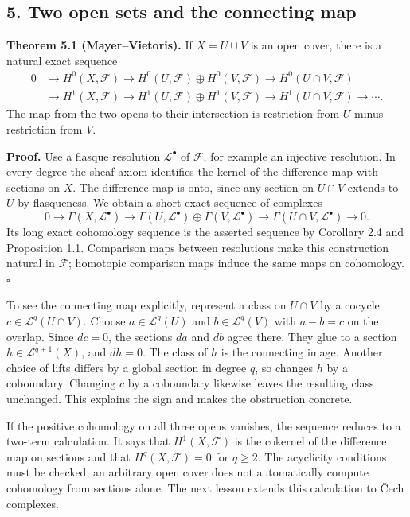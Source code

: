\documentclass[11pt]{article}
\begin{document}
\subsection{5. Two open sets and the connecting
map}\label{two-open-sets-and-the-connecting-map}

\textbf{Theorem 5.1 (Mayer--Vietoris).} If \(X=U\cup V\) is an open
cover, there is a natural exact sequence \[
\begin{aligned}
0&\to H^0(X,\mathcal F)
\to H^0(U,\mathcal F)\oplus H^0(V,\mathcal F)
\to H^0(U\cap V,\mathcal F)\\
&\to H^1(X,\mathcal F)
\to H^1(U,\mathcal F)\oplus H^1(V,\mathcal F)
\to H^1(U\cap V,\mathcal F)\to\cdots.
\end{aligned}
\] The map from the two opens to their intersection is restriction from
\(U\) minus restriction from \(V\).

\textbf{Proof.} Use a flasque resolution \(\mathcal L^\bullet\) of
\(\mathcal F\), for example an injective resolution. In every degree the
sheaf axiom identifies the kernel of the difference map with sections on
\(X\). The difference map is onto, since any section on \(U\cap V\)
extends to \(U\) by flasqueness. We obtain a short exact sequence of
complexes \[
0\to\Gamma(X,\mathcal L^\bullet)
\to\Gamma(U,\mathcal L^\bullet)\oplus\Gamma(V,\mathcal L^\bullet)
\to\Gamma(U\cap V,\mathcal L^\bullet)\to0.
\] Its long exact cohomology sequence is the asserted sequence by
Corollary 2.4 and Proposition 1.1. Comparison maps between resolutions
make this construction natural in \(\mathcal F\); homotopic comparison
maps induce the same maps on cohomology. \(\square\)

To see the connecting map explicitly, represent a class on \(U\cap V\)
by a cocycle \(c\in\mathcal L^q(U\cap V)\). Choose
\(a\in\mathcal L^q(U)\) and \(b\in\mathcal L^q(V)\) with \(a-b=c\) on
the overlap. Since \(dc=0\), the sections \(da\) and \(db\) agree there.
They glue to a section \(h\in\mathcal L^{q+1}(X)\), and \(dh=0\). The
class of \(h\) is the connecting image. Another choice of lifts differs
by a global section in degree \(q\), so changes \(h\) by a coboundary.
Changing \(c\) by a coboundary likewise leaves the resulting class
unchanged. This explains the sign and makes the obstruction concrete.

If the positive cohomology on all three opens vanishes, the sequence
reduces to a two-term calculation. It says that \(H^1(X,\mathcal F)\) is
the cokernel of the difference map on sections and that
\(H^q(X,\mathcal F)=0\) for \(q\geq2\). The acyclicity conditions must
be checked; an arbitrary open cover does not automatically compute
cohomology from sections alone. The next lesson extends this calculation
to Čech complexes.
\end{document}
